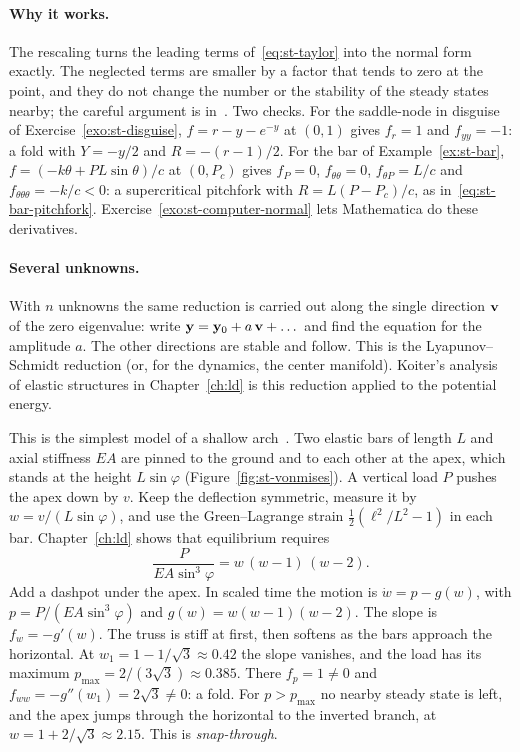 \paragraph{Why it works.}
The rescaling turns the leading terms of~\eqref{eq:st-taylor} into the normal form
exactly. The neglected terms are smaller by a factor that tends to zero at the point,
and they do not change the number or the stability of the steady states nearby; the
careful argument is in~\cite{st-guckenheimer1983,st-kuznetsov2004}. Two checks.
For the saddle-node in disguise of Exercise~\ref{exo:st-disguise},
$f = r - y - e^{-y}$ at $(0,1)$ gives $f_r = 1$ and $f_{yy} = -1$: a fold with
$Y = -y/2$ and $R = -(r-1)/2$. For the bar of Example~\ref{ex:st-bar},
$f = (-k\theta + PL\sin\theta)/c$ at $(0,P_c)$ gives $f_P = 0$, $f_{\theta\theta} = 0$,
$f_{\theta P} = L/c$ and $f_{\theta\theta\theta} = -k/c < 0$: a supercritical
pitchfork with $R = L(P - P_c)/c$, as in~\eqref{eq:st-bar-pitchfork}.
Exercise~\ref{exo:st-computer-normal} lets Mathematica do these derivatives.

\paragraph{Several unknowns.}
With $n$ unknowns the same reduction is carried out along the single direction
$\mathbf{v}$ of the zero eigenvalue: write $\mathbf{y} = \mathbf{y}_0 + a\,\mathbf{v} + \dots$
and find the equation for the amplitude $a$. The other directions are stable and
follow. This is the Lyapunov--Schmidt reduction (or, for the dynamics, the center
manifold). Koiter's analysis of elastic structures in Chapter~\ref{ch:ld} is this
reduction applied to the potential energy.

\begin{example}\label{ex:st-vonmises}
%
This is the simplest model of a shallow arch~\cite[Section~1.2]{st-thompson1973}.
Two elastic bars of length $L$ and axial stiffness $EA$ are pinned to the ground and
to each other at the apex, which stands at the height $L\sin\varphi$
(Figure~\ref{fig:st-vonmises}). A vertical load $P$ pushes the apex down by $v$.
Keep the deflection symmetric, measure it by $w = v/(L\sin\varphi)$, and use the
Green--Lagrange strain $\tfrac12(\ell^2/L^2 - 1)$ in each bar. Chapter~\ref{ch:ld}
shows that equilibrium requires
\begin{equation}\label{eq:st-vonmises}
  \frac{P}{EA\sin^3\varphi} = w\,(w - 1)\,(w - 2) .
\end{equation}
Add a dashpot under the apex. In scaled time the motion is $\dot w = p - g(w)$,
with $p = P/(EA\sin^3\varphi)$ and $g(w) = w(w-1)(w-2)$. The slope is
$f_w = -g'(w)$. The truss is stiff at first, then softens as the bars approach the
horizontal. At $w_1 = 1 - 1/\sqrt3 \approx 0.42$ the slope vanishes, and the load
has its maximum $p_{\max} = 2/(3\sqrt3) \approx 0.385$. There $f_p = 1 \neq 0$ and
$f_{ww} = -g''(w_1) = 2\sqrt3 \neq 0$: a fold. For $p > p_{\max}$ no nearby steady
state is left, and the apex jumps through the horizontal to the inverted branch,
at $w = 1 + 2/\sqrt3 \approx 2.15$. This is \emph{snap-through}.
\end{example}

